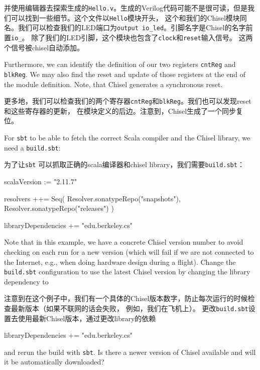 \documentclass[%
    10pt,
    headinclude, footexclude,
    openright, %
    notitlepage,
    cleardoubleempty,
    headsepline,
    pointlessnumbers,
    bibtotoc, idxtotoc,
    ]{scrbook}
\newcommand{\code}[1]{{\small{\texttt{#1}}}}
\begin{document}
并使用编辑器去探索生成的\code{Hello.v}。生成的Verilog代码可能不是很可读，但是我们可以找到一些细节。这个文件以\code{Hello}模块开头，
这个和我们的Chisel模块同名。我们可以检查我们的LED端口为\code{output io\_led}。引脚名字是Chisel的名字前置\code{io\_}。
除了我们的LED引脚，这个模块也包含了\code{clock}和\code{reset}输入信号。
这两个信号被chisel自动添加。

Furthermore, we can identify the definition of our two registers \code{cntReg} and \code{blkReg}.
We may also find the reset and update of those registers at the end of the module definition.
Note, that Chisel generates a synchronous reset.

更多地，我们可以检查我们的两个寄存器\code{cntReg}和\code{blkReg}。我们也可以发现reset和这些寄存器的更新，
在模块定义的后边。注意到，Chisel生成了一个同步复位。

For \code{sbt} to be able to fetch the correct Scala compiler and the Chisel library,
we need a \code{build.sbt}:

为了让\code{sbt} 可以抓取正确的scala编译器和chisel library，我们需要\code{build.sbt}：

\begin{chisel}
scalaVersion := "2.11.7"

resolvers ++= Seq(
  Resolver.sonatypeRepo("snapshots"),
  Resolver.sonatypeRepo("releases")
)

libraryDependencies += "edu.berkeley.cs" %
\end{chisel}

\noindent Note that in this example, we have a concrete Chisel version number to avoid checking on
each run for a new version (which will fail if we are not connected to the Internet,
e.g., when doing hardware design during a flight).
Change the \code{build.sbt} configuration to use the latest Chisel version by changing the
library dependency to

\noindent 注意到在这个例子中，我们有一个具体的Chisel版本数字，防止每次运行的时候检查最新版本（如果不联网的话会失败，
例如，我们在飞机上）。
更改\code{build.sbt}设置去使用最新Chisel版本，通过更改library的依赖

\begin{chisel}
libraryDependencies += "edu.berkeley.cs" %
\end{chisel}

\noindent and rerun the build with \code{sbt}. Is there a newer version of Chisel
available and will it be automatically downloaded?
\end{document}
